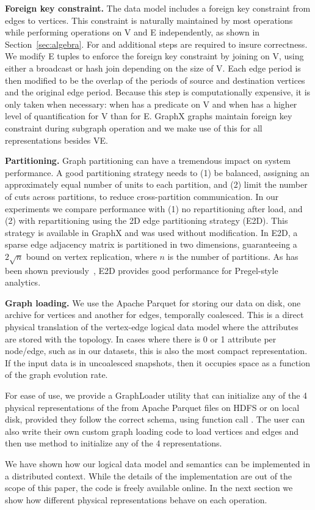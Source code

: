 {\bf Foreign key constraint.}  The \ve data model includes a foreign
key constraint from edges to vertices.  This constraint is naturally
maintained by most operations while performing operations on V and E
independently, as shown in Section~\ref{sec:algebra}.  For
 and  additional steps are required
to insure correctness.  We modify E tuples to enforce the foreign key
constraint by joining on V, using either a broadcast or hash join
depending on the size of V.  Each edge period is then modified to be
the overlap of the periods of source and destination vertices and the
original edge period.  Because this step is computationally expensive,
it is only taken when necessary: when  has a predicate
on V and when  has a higher level of quantification
for V than for E.  GraphX graphs maintain foreign key constraint
during subgraph operation and we make use of this for all
representations besides VE.

{\bf Partitioning.}  Graph partitioning can have a tremendous impact
on system performance.  A good partitioning strategy needs to (1) be
balanced, assigning an approximately equal number of units to each
partition, and (2) limit the number of cuts across partitions, to
reduce cross-partition communication.  In our experiments we compare
performance with (1) no repartitioning after load, and (2) with
repartitioning using the 2D edge partitioning strategy (E2D).  This
strategy is available in GraphX and was used without modification.  In
E2D, a sparse edge adjacency matrix is partitioned in two dimensions,
guaranteeing a $2 \sqrt{n}$ bound on vertex replication, where $n$ is
the number of partitions. As has been shown
previously~\cite{DBLP:conf/osdi/GonzalezXDCFS14,MoffittTempWeb16}, E2D
provides good performance for Pregel-style analytics.

{\bf Graph loading.}  We use the Apache Parquet for storing our data
on disk, one archive for vertices and another for edges, temporally
coalesced.  This is a direct physical translation of the vertex-edge
\tg logical data model where the attributes are stored with the
topology.  In cases where there is 0 or 1 attribute per node/edge,
such as in our datasets, this is also the most compact representation.
If the input data is in uncoalesced snapshots, then it occupies space
as a function of the graph evolution rate.

For ease of use, we provide a GraphLoader utility that can initialize
any of the 4 physical representations of the \tg from Apache Parquet
files on HDFS or on local disk, provided they follow the correct
schema, using function call
.  The \ql user can also
write their own custom graph loading code to load vertices and edges
and then use  method to initialize any of the 4
representations.

We have shown how our logical data model and semantics can be
implemented in a distributed context.  While the details of the
implementation are out of the scope of this paper, the \ql code is
freely available online.  In the next section we show how different
physical representations behave on each operation.

